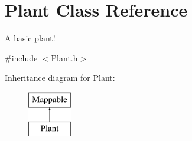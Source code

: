 \hypertarget{classPlant}{\section{\-Plant \-Class \-Reference}
\label{classPlant}
}


\-A basic plant!  




{\ttfamily \#include $<$\-Plant.\-h$>$}

\-Inheritance diagram for \-Plant\-:\begin{figure}[H]
\begin{center}
\leavevmode
\includegraphics[height=2.000000cm]{classPlant}
\end{center}
\end{figure}
